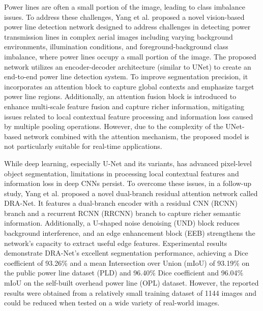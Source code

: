 Power lines are often a small portion of the image, leading to class imbalance issues. To address these challenges, Yang et al. \cite{yang_vision_based_2022} proposed a novel vision-based power line detection network designed to address challenges in detecting power transmission lines in complex aerial images including varying background environments, illumination conditions, and foreground-background class imbalance, where power lines occupy a small portion of the image. The proposed network utilizes an encoder-decoder architecture (similar to UNet) to create an end-to-end power line detection system. To improve segmentation precision, it incorporates an attention block to capture global contexts and emphasize target power line regions. Additionally, an attention fusion block is introduced to enhance multi-scale feature fusion and capture richer information, mitigating issues related to local contextual feature processing and information loss caused by multiple pooling operations. However, due to the complexity of the UNet-based network combined with the attention mechanism, the proposed model is not particularly suitable for real-time applications.

While deep learning, especially U-Net and its variants, has advanced pixel-level object segmentation, limitations in processing local contextual features and information loss in deep CNNs persist. To overcome these issues, in a follow-up study, Yang et al. \cite{yang_dra_net_2023} proposed a novel dual-branch residual attention network called DRA-Net. It features a dual-branch encoder with a residual CNN (RCNN) branch and a recurrent RCNN (RRCNN) branch to capture richer semantic information. Additionally, a U-shaped noise denoising (UND) block reduces background interference, and an edge enhancement block (EEB) strengthens the network's capacity to extract useful edge features. Experimental results demonstrate DRA-Net's excellent segmentation performance, achieving a Dice coefficient of 93.26\% and a mean Intersection over Union (mIoU) of 93.19\% on the public power line dataset (PLD) and 96.40\% Dice coefficient and 96.04\% mIoU on the self-built overhead power line (OPL) dataset. However, the reported results were obtained from a relatively small training dataset of 1144 images and could be reduced when tested on a wide variety of real-world images.

